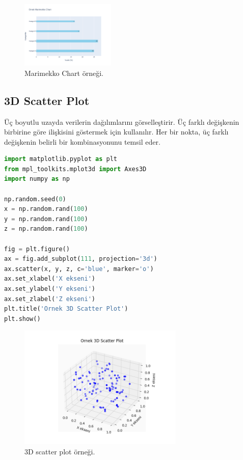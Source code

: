 \begin{figure}[h]
    \centering
    \includegraphics[width=0.4\textwidth]{images/marimekko_chart.png}
    \caption{Marimekko Chart örneği.}
    \label{fig:enter-label}
\end{figure}

\newpage

\subsection{3D Scatter Plot}
Üç boyutlu uzayda verilerin dağılımlarını görselleştirir. Üç farklı değişkenin birbirine göre ilişkisini göstermek için kullanılır. Her bir nokta, üç farklı değişkenin belirli bir kombinasyonunu temsil eder.

\begin{lstlisting}[language=Python]
import matplotlib.pyplot as plt
from mpl_toolkits.mplot3d import Axes3D
import numpy as np

np.random.seed(0)
x = np.random.rand(100)
y = np.random.rand(100)
z = np.random.rand(100)

fig = plt.figure()
ax = fig.add_subplot(111, projection='3d')
ax.scatter(x, y, z, c='blue', marker='o')
ax.set_xlabel('X ekseni')
ax.set_ylabel('Y ekseni')
ax.set_zlabel('Z ekseni')
plt.title('Ornek 3D Scatter Plot')
plt.show()
\end{lstlisting}

\begin{figure}[h]
    \centering
    \includegraphics[width=0.7\textwidth]{images/3d_scatter_plot.png}
    \caption{3D scatter plot örneği.}
    \label{fig:enter-label}
\end{figure}

